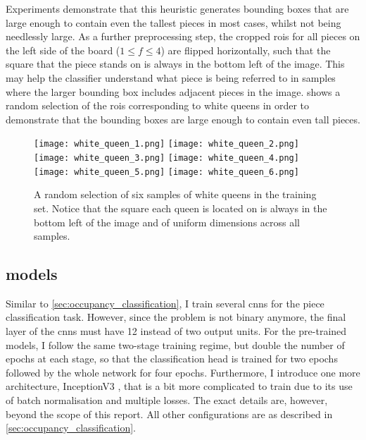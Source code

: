 \documentclass[../report.tex]{subfiles}
\begin{document}
Experiments demonstrate that this heuristic generates bounding boxes that are large enough to contain even the tallest pieces in most cases, whilst not being needlessly large.
As a further preprocessing step, the cropped \glspl{roi} for all pieces on the left side of the board ($1 \leq f \leq 4$) are flipped horizontally, such that the square that the piece stands on is always in the bottom left of the image.
This may help the classifier understand what piece is being referred to in samples where the larger bounding box includes adjacent pieces in the image.
 shows a random selection of the \glspl{roi} corresponding to white queens in order to demonstrate that the bounding boxes are large enough to contain even tall pieces.
\begin{figure}
    \centering
    \texttt{[image: white\_queen\_1.png]}
    \texttt{[image: white\_queen\_2.png]}
    \texttt{[image: white\_queen\_3.png]}
    \texttt{[image: white\_queen\_4.png]}
    \texttt{[image: white\_queen\_5.png]}
    \texttt{[image: white\_queen\_6.png]}
    \caption[A random selection of six samples of white queens in the training set.]{A random selection of six samples of white queens in the training set. Notice that the square each queen is located on is always in the bottom left of the image and of uniform dimensions across all samples.}
    \label{fig:white_queens}
\end{figure}

\subsection{ models}
Similar to \cref{sec:occupancy_classification}, I train several \glspl{cnn} for the piece classification task.
However, since the problem is not binary anymore, the final layer of the \glspl{cnn} must have 12 instead of two output units.
For the pre-trained models, I follow the same two-stage training regime, but double the number of epochs at each stage, so that the classification head is trained for two epochs followed by the whole network for four epochs.
Furthermore, I introduce one more architecture, InceptionV3 \cite{szegedy2016}, that is a bit more complicated to train due to its use of batch normalisation and multiple losses.
The exact details are, however, beyond the scope of this report.
All other configurations are as described in \cref{sec:occupancy_classification}.
\end{document}
